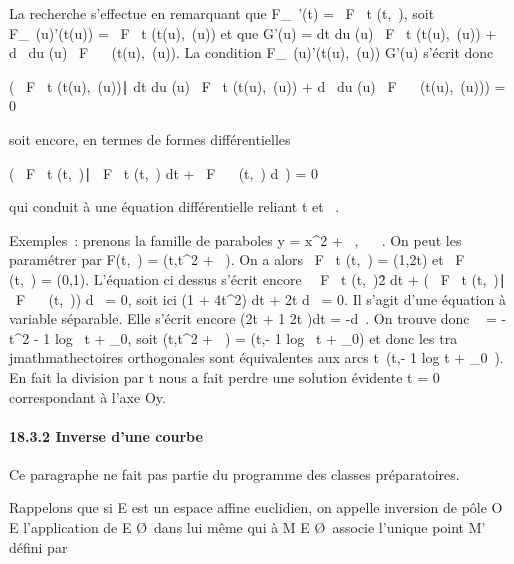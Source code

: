 \documentclass[]{article}
\begin{document}
La recherche s'effectue en remarquant que F_\lambda~'(t) = \partial~F
\over \partial~t (t,\lambda~), soit F_\lambda~(u)'(t(u)) = \partial~F
\over \partial~t (t(u),\lambda~(u)) et que G'(u) = dt
\over du (u) \partial~F \over \partial~t (t(u),\lambda~(u))
+ d\lambda~ \over du (u) \partial~F \over \partial~\lambda~
(t(u),\lambda~(u)). La condition F_\lambda~(u)'(t(u),\lambda~(u)) \bot G'(u) s'écrit
donc

\left ( \partial~F \over \partial~t
(t(u),\lambda~(u))∣ dt \over du
(u) \partial~F \over \partial~t (t(u),\lambda~(u)) + d\lambda~
\over du (u) \partial~F \over \partial~\lambda~
(t(u),\lambda~(u))\right ) = 0

soit encore, en termes de formes différentielles

\left ( \partial~F \over \partial~t
(t,\lambda~)∣ \partial~F \over \partial~t (t,\lambda~)
dt + \partial~F \over \partial~\lambda~ (t,\lambda~) d\lambda~\right ) = 0

qui conduit à une équation différentielle reliant t et \lambda~.

Exemples~: prenons la famille de paraboles y = x^2 + \lambda~, \lambda~ \in
{}~. On peut les paramétrer par F(t,\lambda~) = (t,t^2 + \lambda~). On a
alors  \partial~F \over \partial~t (t,\lambda~) = (1,2t) et  \partial~F
\over \partial~\lambda~ (t,\lambda~) = (0,1). L'équation ci dessus s'écrit
encore \ \partial~F \over \partial~t
(t,\lambda~)\^2 dt + \left
( \partial~F \over \partial~t (t,\lambda~)∣ \partial~F
\over \partial~\lambda~ (t,\lambda~)\right ) d\lambda~ = 0, soit ici
(1 + 4t^2) dt + 2t d\lambda~ = 0. Il s'agit d'une équation à
variable séparable. Elle s'écrit encore (2t + 1 \over
2t )dt = -d\lambda~. On trouve donc \lambda~ = -t^2 - 1
  log~
t + \lambda_0, soit (t,t^2 + \lambda~) =
(t,- 1   log~
t + \lambda_0) et donc les tra\\jmathmathectoires
orthogonales sont équivalentes aux arcs
t\mapsto~(t,- 1 
 log t + \lambda_0~). En fait la division
par t nous a fait perdre une solution évidente t = 0 correspondant à
l'axe Oy.

\paragraph{18.3.2 Inverse d'une courbe}

Ce paragraphe ne fait pas partie du programme des classes préparatoires.

Rappelons que si E est un espace affine euclidien, on appelle inversion
de pôle O \in E l'application de E \diagdown\O\
dans lui même qui à M \in E \diagdown\O\ associe
l'unique point M' défini par
\end{document}
